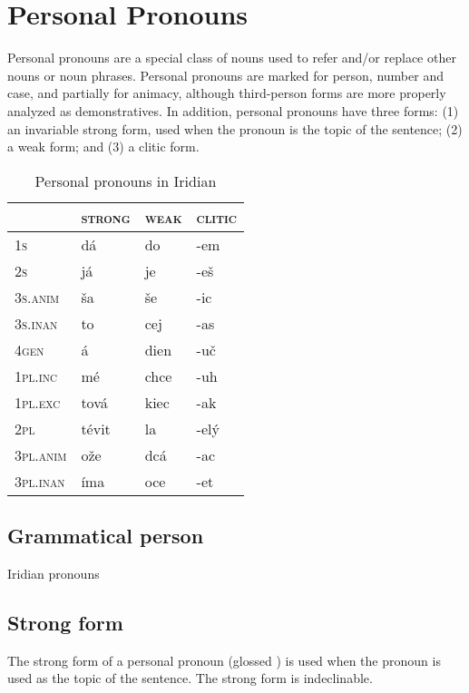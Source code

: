 \section{Personal Pronouns}

Personal pronouns are a special class of nouns used to refer and/or replace other nouns or noun phrases. Personal pronouns are marked for person, number and case, and partially for animacy, although third-person forms are more properly analyzed as demonstratives. In addition, personal pronouns have three forms: (1) an invariable strong form, used when the pronoun is the topic of the sentence; (2) a weak form; and (3) a clitic form.

\begin{table}[h!]
	\caption{Personal pronouns in Iridian}
	\centering\small
	\begin{tabularx}{0.8\textwidth}{>{\scshape}YMMM}

		\toprule
		 &\textsc{strong} &\textsc{weak}&\textsc{clitic}\\
		\midrule
		1s &dá&do&-em\\ \addlinespace
		2s&já&je&-eš\\ \addlinespace
		3s.anim&ša&še&-ic\\ \addlinespace
		3s.inan&to&cej&-as\\ \addlinespace
		4gen&á&dien&-uč\\ \addlinespace
		1pl.inc&mé&chce&-uh\\ \addlinespace
		1pl.exc&tová&kiec&-ak\\ \addlinespace
		2pl&tévit&la&-elý\\ \addlinespace
		3pl.anim&ože&dcá&-ac\\ \addlinespace
		3pl.inan&íma&oce&-et\\ \bottomrule
	\end{tabularx}
\end{table}

\subsection{Grammatical person}
Iridian pronouns
\subsection{Strong form}

The strong form of a personal pronoun (glossed ) is used when the pronoun is used as the topic of the sentence. The strong form is indeclinable.

